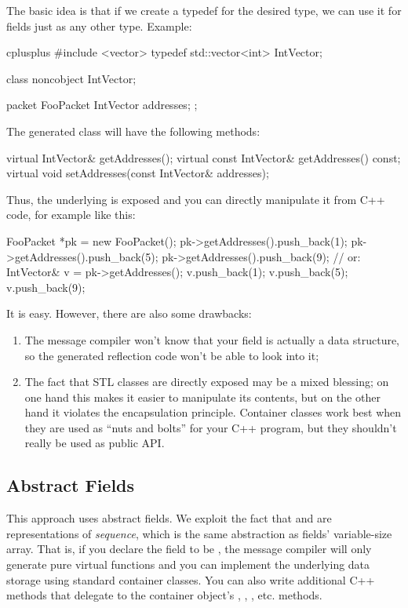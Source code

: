The basic idea is that if we create a typedef for the desired type,
we can use it for fields just as any other type. Example:

\begin{msg}
cplusplus {{
#include <vector>
typedef std::vector<int> IntVector;
}}

class noncobject IntVector;

packet FooPacket {
    IntVector addresses;
};
\end{msg}

The generated class will have the following methods:

\begin{cpp}
virtual IntVector& getAddresses();
virtual const IntVector& getAddresses() const;
virtual void setAddresses(const IntVector& addresses);
\end{cpp}

Thus, the underlying  is exposed and you can directly
manipulate it from C++ code, for example like this:

\begin{cpp}
FooPacket *pk = new FooPacket();
pk->getAddresses().push_back(1);
pk->getAddresses().push_back(5);
pk->getAddresses().push_back(9);
// or:
IntVector& v = pk->getAddresses();
v.push_back(1);
v.push_back(5);
v.push_back(9);
\end{cpp}

It is easy. However, there are also some drawbacks:

\begin{enumerate}
  \item The message compiler won't know that your field is actually
      a data structure, so the generated reflection code won't be able
      to look into it;
  \item The fact that STL classes are directly exposed may be a mixed
      blessing; on one hand this makes it easier to manipulate its
      contents, but on the other hand it violates the encapsulation
      principle. Container classes work best when they are used as
      ``nuts and bolts'' for your C++ program, but they shouldn't really
      be used as public API.
\end{enumerate}

\subsection{Abstract Fields}
\label{sec:msg-def:abstract-fields}

This approach uses abstract fields. We exploit the fact that
 and  are representations of
\textit{sequence}, which is the same abstraction as fields' variable-size
array. That is, if you declare the field to be ,
the message compiler will only generate pure virtual functions and you can
implement the underlying data storage using standard container classes. You
can also write additional C++ methods that delegate to the container
object's , , , etc. methods.

